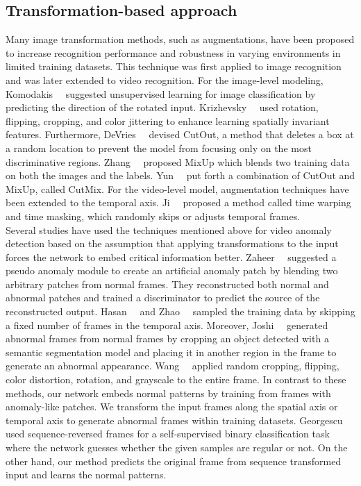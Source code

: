 \documentclass[10pt,twocolumn,letterpaper]{article}
\begin{document}
\subsection{Transformation-based approach} 
Many image transformation methods, such as augmentations, have been proposed to increase recognition performance and robustness in varying environments in limited training datasets. This technique was first applied to image recognition and was later extended to video recognition. 
For the image-level modeling, Komodakis~\etal~\cite{komodakis:hal-01832768} suggested unsupervised learning for image classification by predicting the direction of the rotated input.  Krizhevsky~\etal~\cite{krizhevsky2012imagenet} used rotation, flipping, cropping, and color jittering to enhance learning spatially invariant features. Furthermore, DeVries~\etal~\cite{devries2017improved} devised CutOut, a method that deletes a box at a random location to prevent the model from focusing only on the most discriminative regions. Zhang~\etal~\cite{zhang2017mixup} proposed MixUp which blends two training data on both the images and the labels. Yun~\etal~\cite{yun2019cutmix} put forth a combination of CutOut and MixUp, called CutMix. For the video-level model, augmentation techniques have been extended to the temporal axis. Ji~\etal~\cite{ji2019learning} proposed a method called time warping and time masking, which randomly skips or adjusts temporal frames. \\
\indent Several studies have used the techniques mentioned above for video anomaly detection based on the assumption that applying transformations to the input forces the network to embed critical information better. Zaheer~\etal~\cite{zaheer2020old} suggested a pseudo anomaly module to create an artificial anomaly patch by blending two arbitrary patches from normal frames. They reconstructed both normal and abnormal patches and trained a discriminator to predict the source of the reconstructed output. Hasan~\etal~\cite{hasan2016learning} and Zhao~\etal~\cite{zhao2017spatio} sampled the training data by skipping a fixed number of frames in the temporal axis. Moreover, Joshi~\etal~\cite{joshi2019unsupervised} generated abnormal frames from normal frames by cropping an object detected with a semantic segmentation model and placing it in another region in the frame to generate an abnormal appearance. Wang~\etal~\cite{wang2020cluster} applied random cropping, flipping, color distortion, rotation, and grayscale to the entire frame. In contrast to these methods, our network embeds normal patterns by training from frames with anomaly-like patches. We transform the input frames along the spatial axis or temporal axis to generate abnormal frames within training datasets. Georgescu~\etal~\cite{georgescu2021anomaly} used sequence-reversed frames for a self-supervised binary classification task where the network guesses whether the given samples are regular or not. On the other hand, our method predicts the original frame from sequence transformed input and learns the normal patterns.
\end{document}

